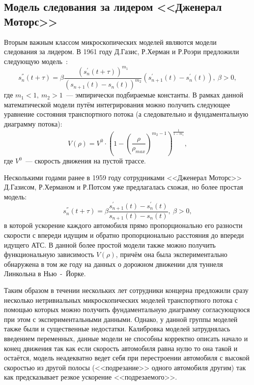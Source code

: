 \subsection{Модель следования за лидером <<Дженерал Моторс>>}\label{subsec:ch1/sec2/sub2}
Вторым важным классом микроскопических моделей являются модели следования за лидером.
В 1961 году Д.Газис, Р.Херман и Р.Роэри предложили следующую модель~\cite{gazis1974traffic}:
\[
    s_n^{''}(t+\tau) = \beta \frac{(s_n^{'}(t+\tau))^{m_1}}{(s_{n+1}(t) - s_n(t))^{m_2}}(s_{n+1}^{'}(t) - s_n^{'}(t)),\ \beta>0,
\]
где \(m_1<1,\ m_2>1\)~--- эмпирически подбираемые константы.
В рамках данной математической модели путём интегрирования можно получить следующее уравнение состояния транспортного потока (а следовательно и фундаментальную диаграмму потока):
\[
    V(\rho) = V^0\cdot\left(1 - \left(\frac{\rho}{\rho_{max}}\right)^{m_2 - 1} \right)^{\frac{1}{1-m_1}},
\]
где \(V^0\)~--- скорость движения на пустой трассе.

Несколькими годами ранее в 1959 году сотрудниками <<Дженерал Моторс>> Д.Газисом, Р.Херманом и Р.Потсом уже предлагалась схожая, но более простая модель:
\[
    s_n^{''}(t+\tau) = \beta \frac{s_{n+1}^{'}(t) - s_n^{'}(t)}{s_{n+1}(t) - s_n(t)},\ \beta>0,
\]
в которой ускорение каждого автомобиля прямо пропорционально его разности скорости с впереди идущим и обратно пропорционально расстояния до впереди идущего АТС.
В данной более простой модели также можно получить функциональную зависимость \(V(\rho)\), причём она была экспериментально обнаружена в том же году на данных о дорожном движении для туннеля Линкольна в Нью~-~Йорке.

Таким образом в течении нескольких лет сотрудники концерна предложили сразу несколько нетривиальных микроскопических моделей транспортного потока с помощью которых можно получить фундаментальную диаграмму согласующуюся при этом с экспериментальными данными.
Однако, у данной группы моделей также были и существенные недостатки.
Калибровка моделей затруднялась введением переменных, данные модели не способны корректно описать начало и конец движения так как если скорость автомобиля равна нулю то она такой и остаётся, модель неадекватно ведет себя при перестроении автомобиля с высокой скоростью из другой полосы (<<подрезание>> одного автомобиля другим) так как предсказывает резкое ускорение <<подрезаемого>>.


